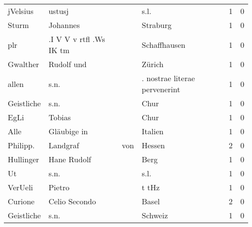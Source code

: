 \begin{center}
\begin{tiny}
\begin{longtabu}{llllrr}
                 jVelsius &                             ustusj &             &                                        s.l. &          1 &         0 \\
                    Sturm &                           Johannes &             &                                    Straburg &          1 &         0 \\
                      plr &            .I V V v rtfl .Ws IK tm &             &                                Schaffhausen &          1 &         0 \\
                 Gwalther &                         Rudolf und &             &                                      Zürich &          1 &         0 \\
                    allen &                               s.n. &             &               . nostrae literae pervenerint &          1 &         0 \\
               Geistliche &                               s.n. &             &                                        Chur &          1 &         0 \\
                     EgLi &                             Tobias &             &                                        Chur &          1 &         0 \\
                     Alle &                        Gläubige in &             &                                     Italien &          1 &         0 \\
                 Philipp. &                           Landgraf &         von &                                      Hessen &          2 &         0 \\
                Hullinger &                        Hane Rudolf &             &                                        Berg &          1 &         0 \\
                       Ut &                               s.n. &             &                                        s.l. &          1 &         0 \\
                  VerUeli &                             Pietro &             &                                       t tHz &          1 &         0 \\
                  Curione &                      Celio Secondo &             &                                       Basel &          2 &         0 \\
               Geistliche &                               s.n. &             &                                     Schweiz &          1 &         0 \\

\end{longtabu}
\end{tiny}
\end{center}
